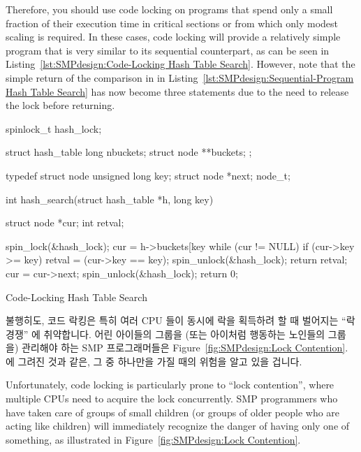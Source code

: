 Therefore, you should use code locking on programs that spend
only a small fraction of their execution time in critical sections or
from which only modest scaling is required.  In these cases,
code locking will provide a relatively simple program that is
very similar to its sequential counterpart,
as can be seen in
Listing~\ref{lst:SMPdesign:Code-Locking Hash Table Search}.
However, note that the simple return of the comparison in
 in
Listing~\ref{lst:SMPdesign:Sequential-Program Hash Table Search}
has now become three statements due to the need to release the
lock before returning.

\fi

\begin{listing}[tbhp]
\begin{VerbatimL}[commandchars=\\\[\]]
spinlock_t hash_lock;

struct hash_table
{
	long nbuckets;
	struct node **buckets;
};

typedef struct node {
	unsigned long key;
	struct node *next;
} node_t;

int hash_search(struct hash_table *h, long key)
{
	struct node *cur;
	int retval;

	spin_lock(&hash_lock);
	cur = h->buckets[key %
	while (cur != NULL) {
		if (cur->key >= key) {
			retval = (cur->key == key);
			spin_unlock(&hash_lock);
			return retval;
		}
		cur = cur->next;
	}
	spin_unlock(&hash_lock);
	return 0;
}
\end{VerbatimL}
\caption{Code-Locking Hash Table Search}
\label{lst:SMPdesign:Code-Locking Hash Table Search}
\end{listing}

불행히도, 코드 락킹은 특히 여러 CPU 들이 동시에 락을 획득하려 할 때 벌어지는
``락 경쟁'' 에 취약합니다.
어린 아이들의 그룹을 (또는 아이처럼 행동하는 노인들의 그룹을) 관리해야 하는 SMP
프로그래머들은
Figure~\ref{fig:SMPdesign:Lock Contention}. 에 그려진 것과 같은, 그 중 하나만을
가질 때의 위험을 알고 있을 겁니다.

\iffalse

Unfortunately, code locking is particularly prone to ``lock contention'',
where multiple CPUs need to acquire the lock concurrently.
SMP programmers who have taken care of groups of small children
(or groups of older people who are acting like children) will immediately
recognize the danger of having only one of something,
as illustrated in Figure~\ref{fig:SMPdesign:Lock Contention}.

